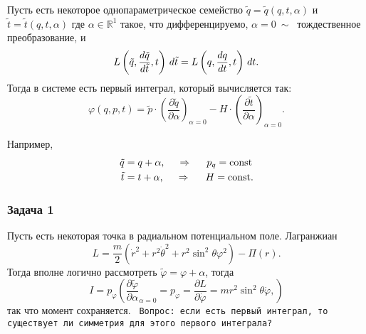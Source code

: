 \begin{to_thr}
    Пусть есть некоторое однопараметрическое семейство $\tilde{q} = \tilde{q}(q, t, \alpha)$ и $\tilde{t} = \tilde{t} (q, t, \alpha)$ где $\alpha \in \mathbb{R}^1$ такое, что дифференцируемо, $\alpha =0 \ \sim \ $ тождественное преобразование, и
    \begin{equation*}
        L \left(\tilde{q}, \frac{d \tilde{q}}{d \tilde{t}}, t\right) \, d \tilde{t} = L\left(q, \frac{d q}{d t}, t\right) \, d t.
    \end{equation*}
    Тогда в системе есть первый интеграл, который вычисляется так:
    \begin{equation*}
        \varphi(q, p, t) = \tilde{p} \cdot \left(
            \frac{\partial \tilde{q}}{\partial \alpha} 
        \right)_{\alpha=0} - H \cdot \left(
            \frac{\partial \tilde{t}}{\partial \alpha} 
        \right)_{\alpha=0}.
    \end{equation*}
\end{to_thr}

Например, 
\begin{align*}
    \tilde{q} &= q + \alpha, \hspace{0.5cm} \Rightarrow \hspace{0.5cm} p_q = \text{const} \\
    \tilde{t} &= t + \alpha, \hspace{0.5cm} \Rightarrow \hspace{0.5cm} H = \text{const}.
\end{align*}


\subsubsection*{Задача 1}
Пусть есть некоторая точка в радиальном потенциальном поле. Лагранжиан
\begin{equation*}
    L = \frac{m}{2} (
        \dot{r}^2 + r^2 \dot{\theta}^2 + r^2 \sin^2 \theta \varphi^2
    ) - \Pi(r).
\end{equation*}
Тогда вполне логично рассмотреть $\tilde{\varphi} = \varphi + \alpha$, тогда
\begin{equation*}
    I = p_\varphi \left(
        \frac{\partial \tilde{\varphi}}{\partial \alpha}_{\alpha=0} = p_\varphi = \frac{\partial L}{\partial \dot{\varphi}} = m r^2 \sin^2 \theta \dot{\varphi},
    \right)
\end{equation*}
так что момент сохраняется. 
\texttt{ Вопрос: если есть первый интеграл, то существует ли симметрия для этого первого интеграла?}

